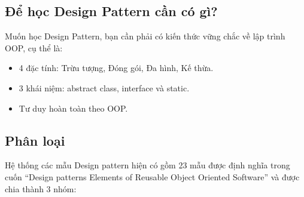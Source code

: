 \documentclass[14pt]{article}
\begin{document}
\subsection{Để học Design Pattern cần có gì?}
\noindent Muốn học Design Pattern, bạn cần phải có kiến thức vững chắc về lập trình OOP, cụ thể là:

\begin{itemize}
\item 4 đặc tính: Trừu tượng, Đóng gói, Đa hình, Kế thừa.
 \item 3 khái niệm: abstract class, interface và static.
 \item Tư duy hoàn toàn theo OOP.
\end{itemize}
\subsection{Phân loại}
Hệ thống các mẫu Design pattern hiện có gồm 23 mẫu được định nghĩa trong cuốn “Design patterns Elements of Reusable Object Oriented Software” và được chia thành 3 nhóm:
\end{document}
